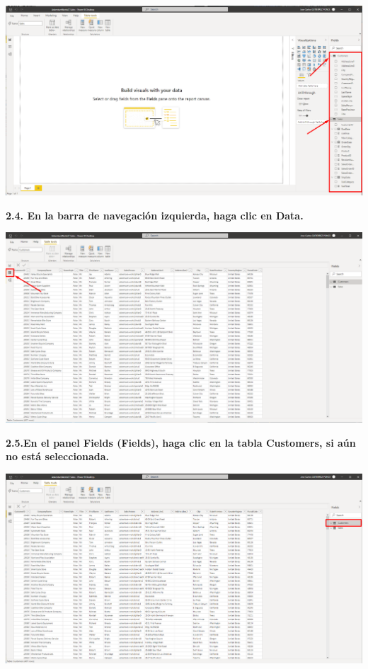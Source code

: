 \documentclass{article}
\begin{document}
    \begin{center}
		\includegraphics[width=14cm]{./images/16} 
	\end{center}
	
\textbf{2.4. En la barra de navegación izquierda, haga clic en \textbf{Data}.}

    \begin{center}
		\includegraphics[width=14cm]{./images/17} 
	\end{center}
 \newpage
\textbf{2.5.En el panel \textbf{Fields} \textbf{(Fields)}, haga clic en la tabla Customers, si aún no está seleccionada.}

    \begin{center}
		\includegraphics[width=14cm]{./images/18} 
	\end{center}
	
\end{document}
